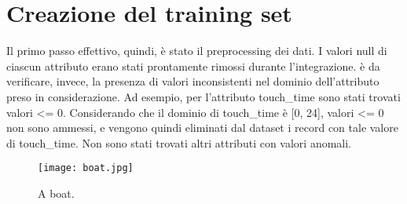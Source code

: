 \section{Creazione del training set}

Il primo passo effettivo, quindi, è stato il preprocessing dei dati. I valori null di ciascun attributo erano stati prontamente rimossi durante l’integrazione. è da verificare, invece, la presenza di valori inconsistenti nel dominio dell’attributo preso in considerazione.
Ad esempio, per l’attributo touch_time sono stati trovati valori <= 0. Considerando che il dominio di touch_time è [0, 24], valori <= 0 non sono ammessi, e vengono quindi eliminati dal dataset i record con tale valore di touch_time. Non sono stati trovati altri attributi con valori anomali.

\begin{figure}
  \texttt{[image: boat.jpg]}
  \caption{A boat.}
  \label{fig:boat1}
\end{figure}

